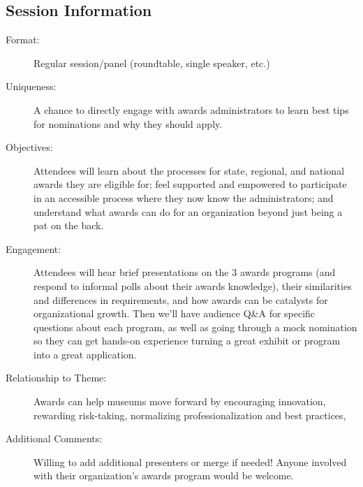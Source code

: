 \documentclass{report}
\begin{document}
              \subsection*{Session Information}
                \begin{description}
                  \item [Format:] Regular session/panel (roundtable, single speaker, etc.)
							    
							    \item [Uniqueness:]A chance to directly engage with awards administrators to learn best tips for nominations and why they should apply.
							    \item [Objectives:]Attendees will learn about the processes for state, regional, and national awards they are eligible for; feel supported and empowered to participate in an accessible process where they now know the administrators; and understand what awards can do for an organization beyond just being a pat on the back.
							    \item [Engagement:]Attendees will hear brief presentations on the 3 awards programs (and respond to informal polls about their awards knowledge), their similarities and differences in requirements, and how awards can be catalysts for organizational growth. Then we'll have audience Q\&A for specific questions about each program, as well as going through a mock nomination so they can get hands-on experience turning a great exhibit or program into a great application.
							    \item [Relationship to Theme:]Awards can help museums move forward by encouraging innovation, rewarding risk-taking, normalizing professionalization and best practices,
							    
                    \item [Additional Comments: ]Willing to add additional presenters or merge if needed! Anyone involved with their organization's awards program would be welcome.

                \end{description}
\end{document}
